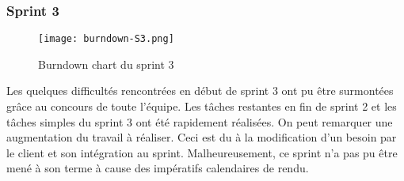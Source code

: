 \subsubsection{Sprint 3}

\begin{figure}[h]
\begin{center}
	\texttt{[image: burndown-S3.png]}
\end{center}
	\caption{Burndown chart du sprint 3}
\end{figure}

Les quelques difficultés rencontrées en début de sprint 3 ont pu être surmontées grâce au concours de toute l'équipe. Les tâches restantes en fin de sprint 2 et les tâches simples du sprint 3 ont été rapidement réalisées. On peut remarquer une augmentation du travail à réaliser. Ceci est du à la modification d'un besoin par le client et son intégration au sprint. Malheureusement, ce sprint n'a pas pu être mené à son terme à cause des impératifs calendaires de rendu.
